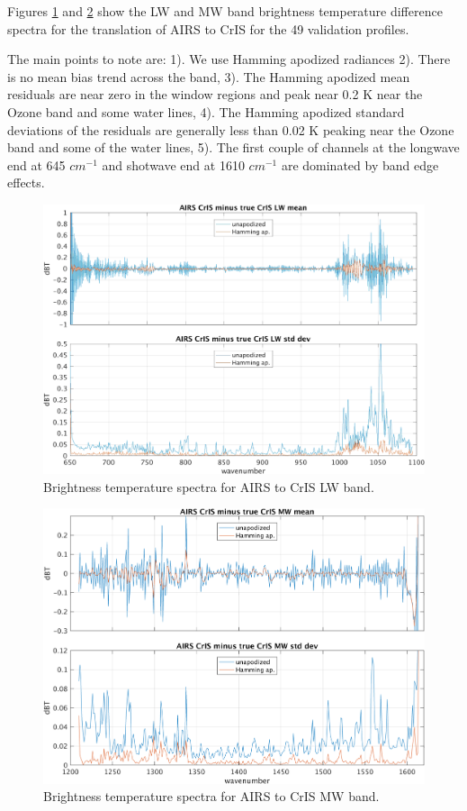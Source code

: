\documentclass[11pt]{article}
\begin{document}
Figures \ref{fig:1a} and \ref{fig:1b} show the LW and MW band brightness temperature difference spectra for the translation of AIRS to CrIS for the 49 validation profiles.

The main points to note are: 1). We use Hamming apodized radiances 2). There is no mean bias trend across the band, 3). The Hamming apodized mean residuals are near zero in the window regions and peak near 0.2 K near the Ozone band and some water lines, 4). The Hamming apodized standard deviations of the residuals are generally less than 0.02 K peaking near the Ozone band and some of the water lines, 5). The first couple of channels at the longwave end at 645 \(cm^{-1}\) and shotwave end at 1610 \(cm^{-1}\) are dominated by band edge effects.

\begin{figure}[htb]
\centering
\includegraphics[width=.9\linewidth]{./figs/a2cris_diff_LW.png}
\caption{\label{fig:orgparagraph1}
  Brightness temperature spectra for AIRS to CrIS LW band.}
\label{fig:1a}
\end{figure}

\begin{figure}[htb]
\centering
\includegraphics[width=.9\linewidth]{./figs/a2cris_diff_MW.png}
\caption{\label{fig:orgparagraph2}
  Brightness temperature spectra for AIRS to CrIS MW band.}
\label{fig:1b}
\end{figure}
\end{document}
